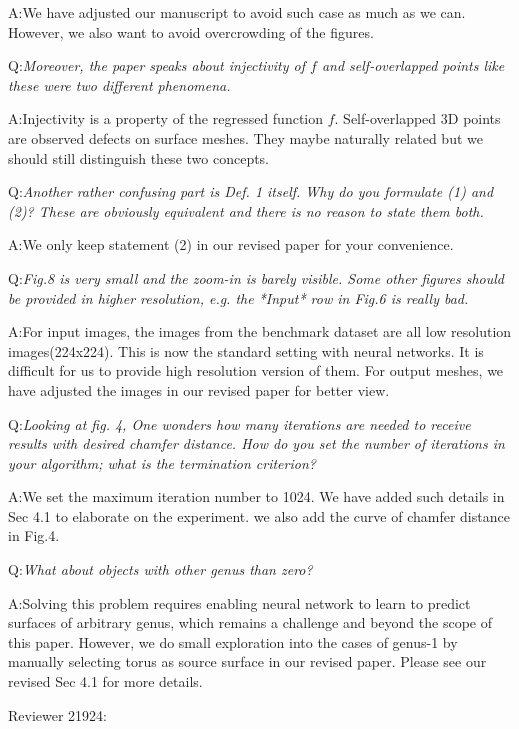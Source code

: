 \documentclass[10pt]{letter} %
\begin{document}
	A:We have adjusted our manuscript to avoid such case as much as we can. However, we also want to avoid overcrowding of the figures.
	
	Q:\emph{Moreover, the paper speaks about injectivity of $f$ and self-overlapped points like these were two different phenomena.}
	
	A:Injectivity is a property of the regressed function $f$. Self-overlapped 3D points are observed defects on surface meshes. They maybe naturally related but we should still distinguish these two concepts.
	
	Q:\emph{Another rather confusing part is Def. 1 itself. Why do you formulate (1) and (2)? These are obviously equivalent and there is no reason to state them both.}
	
	A:We only keep statement (2) in our revised paper for your convenience.
	
	Q:\emph{Fig.8 is very small and the zoom-in is barely visible.  Some other figures should be provided in higher resolution, e.g. the *Input* row in Fig.6 is really bad.} 
	
	A:For input images, the images from the benchmark dataset are all low resolution images(224x224). This is now the standard setting with neural networks. It is difficult for us to provide high resolution version of them. For output meshes, we have adjusted the images in our revised paper for better view.
	
	Q:\emph{Looking at fig. 4, One wonders how many iterations are needed to receive results with desired chamfer distance. How do you set the number of iterations in your algorithm; what is the termination criterion?}
	
	A:We set the maximum iteration number to 1024. We have added such details in Sec 4.1 to elaborate on the experiment. we also add the curve of chamfer distance in Fig.4. 
	
	Q:\emph{What about objects with other genus than zero?}
	
	A:Solving this problem requires enabling neural network to learn to predict surfaces of arbitrary genus, which remains a challenge and beyond the scope of this paper. However, we do small exploration into the cases of genus-1 by manually selecting torus as source surface in our revised paper. Please see our revised Sec 4.1 for more details.
	
	\hdashrule{\linewidth}{1pt}{1mm}
	Reviewer 21924:\\
	
\end{document}
